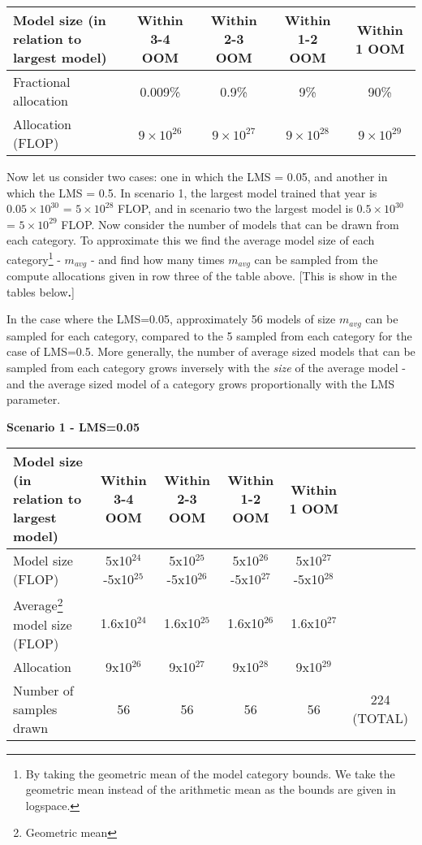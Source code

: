 \documentclass[11pt]{article}
\begin{document}
\begin{table}[h]
\centering
\begin{tabular}{|l|c|c|c|c|}
\hline
Model size (in relation to largest model) & Within 3-4 OOM & Within 2-3 OOM & Within 1-2 OOM & Within 1 OOM \\
\hline
Fractional allocation & 0.009\% & 0.9\% & 9\% & 90\% \\
\hline
Allocation (FLOP) & $9\times10^{26}$ & $9\times10^{27}$ & $9\times10^{28}$ & $9\times10^{29}$ \\
\hline
\end{tabular}
\end{table}

Now let us consider two cases: one in which the LMS = 0.05, and another in which the LMS = 0.5. In scenario 1, the largest model trained that year is $0.05\times10^{30}$ = $5\times10^{28}$ FLOP, and in scenario two the largest model is $0.5\times10^{30}$ = $5\times10^{29}$ FLOP. Now consider the number of models that can be drawn from each category. To approximate this we find the average model size of each category\footnote{By taking the geometric mean of the model category bounds. We take the geometric mean instead of the arithmetic mean as the bounds are given in logspace.} - $m_{avg}$ - and find how many times $m_{avg}$ can be sampled from the compute allocations given in row three of the table above. [This is show in the tables below\textbf{.}]

In the case where the LMS=0.05, approximately 56 models of size $m_{avg}$ can be sampled for each category, compared to the 5 sampled from each category for the case of LMS=0.5. More generally, the number of average sized models that can be sampled from each category grows inversely with the \textit{size} of the average model - and the average sized model of a category grows proportionally with the LMS parameter.

\textbf{Scenario 1 - LMS=0.05}

\begin{table}[h]
\centering
\begin{tabular}{|l|c|c|c|c|c|}
\hline
Model size (in relation to largest model) & Within 3-4 OOM & Within 2-3 OOM & Within 1-2 OOM & Within 1 OOM & \\
\hline
Model size (FLOP) & 5x10$^{24}$-5x10$^{25}$ & 5x10$^{25}$-5x10$^{26}$ & 5x10$^{26}$-5x10$^{27}$ & 5x10$^{27}$-5x10$^{28}$ & \\
\hline
Average\footnote{Geometric mean} model size (FLOP) & 1.6x10$^{24}$ & 1.6x10$^{25}$ & 1.6x10$^{26}$ & 1.6x10$^{27}$ & \\
\hline
Allocation & 9x10$^{26}$ & 9x10$^{27}$ & 9x10$^{28}$ & 9x10$^{29}$ & \\
\hline
Number of samples drawn & 56 & 56 & 56 & 56 & 224 (TOTAL) \\
\hline
\end{tabular}
\end{table}
\end{document}
